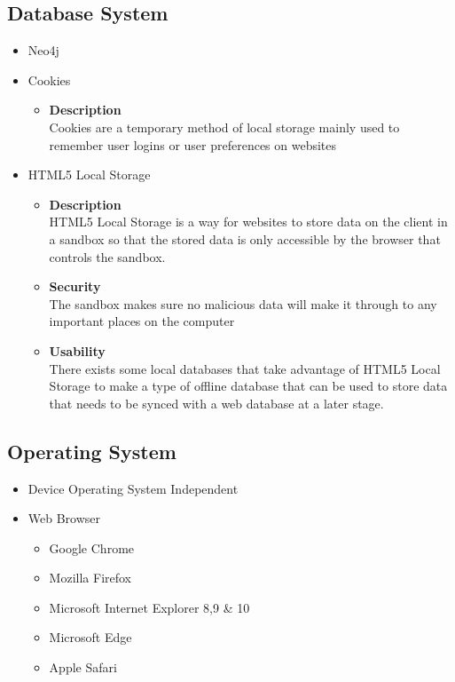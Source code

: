 \documentclass[11pt,fleqn]{book} %
\begin{document}
	\subsection{Database System}
	\begin{itemize}
		\item Neo4j
		\item Cookies
		\begin{itemize}
			\item \textbf{Description}\\
			Cookies are a temporary method of local storage mainly used to remember user logins or user preferences on websites
		\end{itemize}
		\item HTML5 Local Storage
		\begin{itemize}
			\item \textbf{Description}\\
			HTML5 Local Storage is a way for websites to store data on the client in a sandbox so that the stored data is only accessible by the browser that controls the sandbox.
			\item \textbf{Security}\\
			The sandbox makes sure no malicious data will make it through to any important places on the computer
			\item \textbf{Usability}\\
			There exists some local databases that take advantage of HTML5 Local Storage to make a type of offline database that can be used to store data that needs to be synced with a web database at a later stage.
		\end{itemize}
	\end{itemize}
	\subsection{Operating System}
	\begin{itemize}
		\item Device Operating System Independent
		\item Web Browser
		\begin{itemize}
			\item Google Chrome
			\item Mozilla Firefox
			\item Microsoft Internet Explorer 8,9 \& 10
			\item Microsoft Edge
			\item Apple Safari
		\end{itemize}
	\end{itemize}
\end{document}

